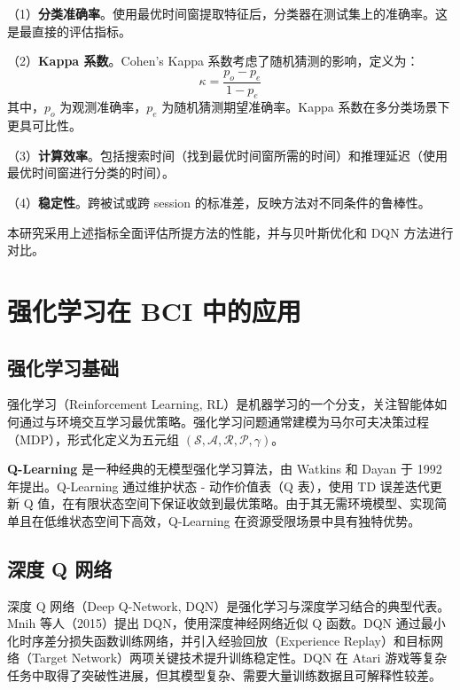 （1）\textbf{分类准确率}。使用最优时间窗提取特征后，分类器在测试集上的准确率。这是最直接的评估指标。

（2）\textbf{Kappa 系数}。Cohen's Kappa 系数考虑了随机猜测的影响，定义为：
\begin{equation}
\kappa = \frac{p_o - p_e}{1 - p_e}
\end{equation}
其中，$p_o$ 为观测准确率，$p_e$ 为随机猜测期望准确率\cite{cohen1960coefficient}。Kappa 系数在多分类场景下更具可比性。

（3）\textbf{计算效率}。包括搜索时间（找到最优时间窗所需的时间）和推理延迟（使用最优时间窗进行分类的时间）\cite{yang2015time}。

（4）\textbf{稳定性}。跨被试或跨 session 的标准差，反映方法对不同条件的鲁棒性\cite{lotte2011regularizing}。

本研究采用上述指标全面评估所提方法的性能，并与贝叶斯优化和 DQN 方法进行对比。

\section{强化学习在 BCI 中的应用}
\label{sec:rl_in_bci}

\subsection{强化学习基础}
\label{subsec:rl_basics}

强化学习（Reinforcement Learning, RL）是机器学习的一个分支，关注智能体如何通过与环境交互学习最优策略\cite{sutton2018reinforcement}。强化学习问题通常建模为马尔可夫决策过程（MDP），形式化定义为五元组 $(\mathcal{S}, \mathcal{A}, \mathcal{R}, \mathcal{P}, \gamma)$。

\textbf{Q-Learning} 是一种经典的无模型强化学习算法，由 Watkins 和 Dayan 于 1992 年提出\cite{watkins1992q}。Q-Learning 通过维护状态 - 动作价值表（Q 表），使用 TD 误差迭代更新 Q 值，在有限状态空间下保证收敛到最优策略。由于其无需环境模型、实现简单且在低维状态空间下高效，Q-Learning 在资源受限场景中具有独特优势。

\subsection{深度 Q 网络}
\label{subsec:deep_q_network}

深度 Q 网络（Deep Q-Network, DQN）是强化学习与深度学习结合的典型代表。Mnih 等人（2015）提出 DQN，使用深度神经网络近似 Q 函数\cite{mnih2015human}。DQN 通过最小化时序差分损失函数训练网络，并引入经验回放（Experience Replay）和目标网络（Target Network）两项关键技术提升训练稳定性。DQN 在 Atari 游戏等复杂任务中取得了突破性进展，但其模型复杂、需要大量训练数据且可解释性较差。

